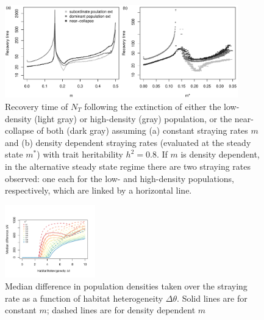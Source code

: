 \documentclass[twocolumn,preprintnumbers,amsmath,amssymb,superscriptaddress]{revtex4}
\begin{document}
\begin{figure}
  \captionsetup{justification=raggedright,
singlelinecheck=false
}
\centering
\includegraphics[width=0.9\textwidth]{figs2/fig_relax_highh.pdf}
\caption{
Recovery time of $N_T$ following the extinction of either the low-density (light gray) or high-density (gray) population, or the near-collapse of both (dark gray) assuming (a) constant straying rates $m$ and (b) density dependent straying rates (evaluated at the steady state $m^*$) with trait heritability $h^2=0.8$.
If $m$ is density dependent, in the alternative steady state regime there are two straying rates observed: one each for the low- and high-density populations, respectively, which are linked by a horizontal line.
} \label{fig:relax_highh}
\end{figure}



\begin{figure}
  \captionsetup{justification=raggedright,
singlelinecheck=false
}
\centering
\includegraphics[width=0.35\textwidth]{figs2/fig_thetadiffN.pdf}
\caption{
Median difference in population densities taken over the straying rate as a function of habitat heterogeneity $\Delta\theta$.
Solid lines are for constant $m$; dashed lines are for density dependent $m$} \label{fig:thetadiffN}
\end{figure}
\end{document}
